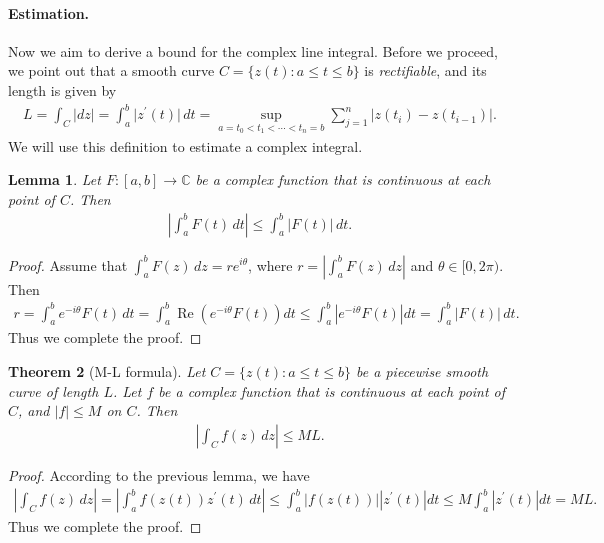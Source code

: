 \documentclass{article}
\numberwithin{equation}{section}
\newcommand{\bbC}{\mathbb{C}}
\DeclareMathOperator{\re}{Re}
\theoremstyle{plain}
\newtheorem{theorem}{Theorem}[section]
\newtheorem{lemma}[theorem]{Lemma}
\theoremstyle{definition}
\begin{document}
\paragraph{Estimation.} Now we aim to derive a bound for the complex line integral. Before we proceed, we point out that a smooth curve $C=\{z(t):a\leq t\leq b\}$ is \textit{rectifiable}, and its length is given by
\begin{align*}
	L=\int_C\vert dz\vert=\int_a^b\vert z^\prime(t)\vert\,dt=\sup_{a=t_0<t_1<\cdots<t_n=b}\sum_{j=1}^n\vert z(t_i)-z(t_{i-1})\vert.
\end{align*}
We will use this definition to estimate a complex integral.
\begin{lemma}
Let $F:[a,b]\to\bbC$ be a complex function that is continuous at each point of $C$. Then
\begin{align*}
	\left\vert\int_a^b F(t)\,dt\right\vert\leq\int_a^b\vert F(t)\vert\,dt.
\end{align*}
\end{lemma}
\begin{proof}
Assume that $\int_a^b F(z)\,dz=re^{i\theta}$, where $r=\left\vert\int_a^b F(z)\,dz\right\vert$ and $\theta\in[0,2\pi)$. Then
\begin{align*}
	r=\int_a^be^{-i\theta}F(t)\,dt=\int_a^b\re\left(e^{-i\theta}F(t)\right)dt\leq\int_a^b\left\vert e^{-i\theta}F(t)\right\vert dt=\int_a^b\vert F(t)\vert\,dt.
\end{align*}
Thus we complete the proof.
\end{proof}
\begin{theorem}[M-L formula]\label{mlformula}
Let $C=\{z(t):a\leq t\leq b\}$ be a piecewise smooth curve of length $L$. Let $f$ be a complex function that is continuous at each point of $C$, and $\vert f\vert\leq M$ on $C$. Then
\begin{align*}
	\left\vert\int_C f(z)\,dz\right\vert\leq ML.
\end{align*}
\end{theorem}
\begin{proof}
According to the previous lemma, we have
\begin{align*}
	\left\vert\int_C f(z)\,dz\right\vert=\left\vert\int_a^b f(z(t))z^\prime(t)\,dt\right\vert\leq\int_a^b\vert f(z(t))\vert\left\vert z^\prime(t)\right\vert dt\leq M\int_a^b\left\vert z^\prime(t)\right\vert dt=ML.
\end{align*}
Thus we complete the proof.
\end{proof}
\end{document}

